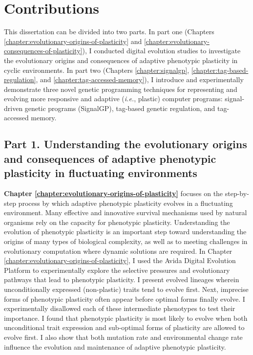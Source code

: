 \section{Contributions}


This dissertation can be divided into two parts.
In part one (Chapters \ref{chapter:evolutionary-origins-of-plasticity} and \ref{chapter:evolutionary-consequences-of-plasticity}), I conducted digital evolution studies to investigate the evolutionary origins and consequences of adaptive phenotypic plasticity in cyclic environments.
In part two (Chapters \ref{chapter:signalgp}, \ref{chapter:tag-based-regulation}, and \ref{chapter:tag-accessed-memory}), I introduce and experimentally demonstrate three novel genetic programming techniques for representing and evolving more responsive and adaptive (\textit{i.e.}, plastic) computer programs: signal-driven genetic programs (SignalGP), tag-based genetic regulation, and tag-accessed memory.

\subsection{Part 1. Understanding the evolutionary origins and consequences of adaptive phenotypic plasticity in fluctuating environments}

\textbf{Chapter \ref{chapter:evolutionary-origins-of-plasticity}} focuses on the step-by-step process by which adaptive phenotypic plasticity evolves in a fluctuating environment.
Many effective and innovative survival mechanisms used by natural organisms rely on the capacity for phenotypic plasticity.
Understanding the evolution of phenotypic plasticity is an important step toward understanding the origins of many types of biological complexity, as well as to meeting challenges in evolutionary computation where dynamic solutions are required.
In Chapter \ref{chapter:evolutionary-origins-of-plasticity}, I used the Avida Digital Evolution Platform to experimentally explore the selective pressures and evolutionary pathways that lead to phenotypic plasticity.  
I present evolved lineages wherein unconditionally expressed (non-plastic) traits tend to evolve first.
Next, imprecise forms of phenotypic plasticity often appear before optimal forms finally evolve.   
I experimentally disallowed each of these intermediate phenotypes to test their importance.
I found that phenotypic plasticity is most likely to evolve when both unconditional trait expression and sub-optimal forms of plasticity are allowed to evolve first.
I also show that both mutation rate and environmental change rate influence the evolution and maintenance of adaptive phenotypic plasticity.

